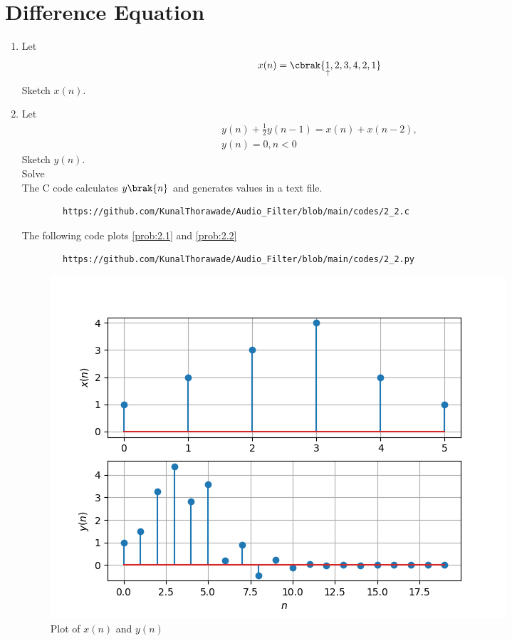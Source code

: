 \documentclass[journal,12pt,twocolumn]{IEEEtran}
\theoremstyle{remark}
\begin{document}
\section{Difference Equation}
\begin{enumerate}[label=\thesection.\arabic*,ref=\thesection.\theenumi]
	\item Let
		\begin{equation}
			x(n) = \cbrak{\underset{\uparrow}{1},2,3,4,2,1} \label{prob:2.1}
		\end{equation}
		Sketch $x(n)$. 
	\item Let
		\begin{multline}
			y(n) + \frac{1}{2}y(n-1) = x(n) + x(n-2), 
			\\
			y(n) = 0, n < 0 \label{prob:2.2}
		\end{multline}
		Sketch $y(n)$.\\
		Solve\\
		\solution  The C code calculates $y\brak{n}$ and generates values in a text file.
		\begin{lstlisting}
		https://github.com/KunalThorawade/Audio_Filter/blob/main/codes/2_2.c
		\end{lstlisting} 
		The following code plots \eqref{prob:2.1} and \eqref{prob:2.2}
		\begin{lstlisting}
		https://github.com/KunalThorawade/Audio_Filter/blob/main/codes/2_2.py
		\end{lstlisting}

		\begin{figure}[H]
				\centering
					\includegraphics[width=\columnwidth]{figs/Plot_xn_yn.png}
						\caption{Plot of $x(n)$ and $y(n)$}
							\label{fig:xnyn}
		\end{figure}
\end{enumerate}
\end{document}

